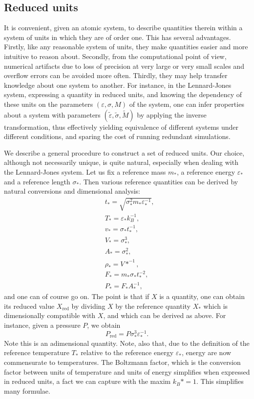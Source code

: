 \subsection{Reduced units}
It is convenient, given an atomic system, to describe quantities therein within a system of units in which they are of order one. This has several advantages. 
Firstly, like any reasonable system of units, they make quantities easier and more intuitive to reason about.
Secondly, from the computational point of view, numerical artifacts due to loss of precision at very large or very small scales and overflow errors can be avoided more often.
Thirdly, they may help transfer knowledge about one system to another. 
For instance, in the Lennard-Jones system, expressing a quantity in reduced units,
and knowing the dependency of these units on the parameters $(\varepsilon,\sigma,M)$ of the system, one can infer properties about a system with parameters $(\tilde\varepsilon,\tilde\sigma,\tilde M)$ by applying the inverse transformation, thus effectively yielding equivalence of different systems under different conditions, and sparing the cost of running redundant simulations.

We describe a general procedure to construct a set of reduced units. Our choice, although not necessarily unique, is quite natural, especially when dealing with the Lennard-Jones system.
Let us fix a reference mass $m_*$, a reference energy $\varepsilon_*$ and a reference length $\sigma _*$. Then various reference quantities can be derived by natural conversions and dimensional analysis:
\begin{align*}&t_*=\sqrt{\sigma_*^2m_*\varepsilon_*^{-1}},\tag{time}\\
    &T_*=\varepsilon_*k_B^{-1},\tag{temperature}\\
    &v_*=\sigma_*t_*^{-1},\tag{velocity}\\
    &V_*=\sigma_*^3,\tag{volume}\\
    &A_*=\sigma_*^2,\tag{area}\\
    &\rho_*=V*^{-1},\tag{density}\\
    &F_*=m_*\sigma_*t_*^{-2},\tag{force}\\
    &P_*=F_*A_*^{-1},\tag{pressure}
\end{align*}
and one can of course go on. The point is that if $X$ is a quantity, one can obtain its reduced value $X_{\mathrm{red}}$ by dividing $X$ by the reference quantity $X_*$ which is dimensionally compatible with $X$, and which can be derived as above.
For instance, given a pressure $P$, we obtain
$$P_{\mathrm{red}}= P\sigma_*^3\varepsilon_*^{-1}.$$
Note this is an adimensional quantity. Note, also that, due to the definition of the reference temperature $T_*$ relative to the reference energy $\varepsilon_*$, energy are now commensurate to temperatures.
The Boltzmann factor, which is the conversion factor between units of temperature and units of energy simplifies when expressed in reduced units, a fact we can capture with the maxim ${k_B}*=1$. This simplifies many formulae.

